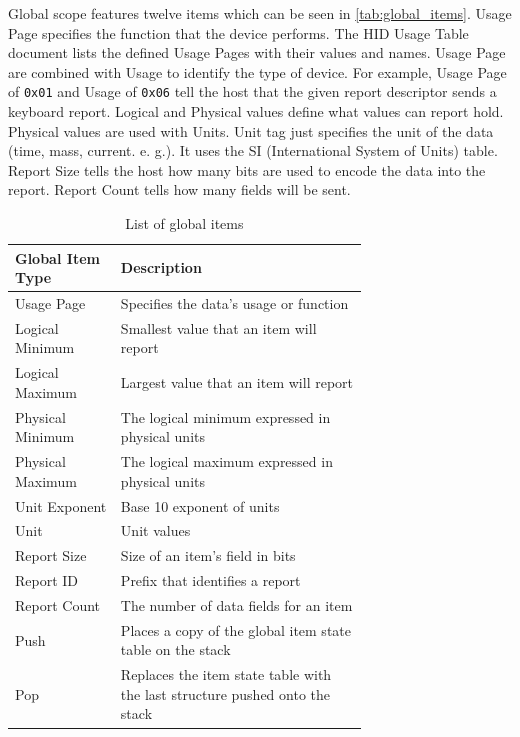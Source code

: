 Global scope features twelve items which can be seen in \autoref{tab:global_items}. Usage Page specifies the function that the device performs. The HID Usage Table document lists the defined Usage Pages with their values and names. Usage Page are combined with Usage to identify the type of device. For example, Usage Page of \verb|0x01| and Usage of \verb|0x06| tell the host that the given report descriptor sends a keyboard report. Logical and Physical values define what values can report hold. Physical values are used with Units. Unit tag just specifies the unit of the data (time, mass, current. e. g.). It uses the SI (International System of Units) table. Report Size tells the host how many bits are used to encode the data into the report. Report Count tells how many fields will be sent.

\begin{table}[ht]
    \centering
    \begin{tabular}{|l|p{0.7\linewidth}|} \hline
         \textbf{Global Item Type} & \textbf{Description} \\ \hline
         Usage Page & Specifies the data's usage or function \\ \hline
         Logical Minimum & Smallest value that an item will report \\ \hline
         Logical Maximum & Largest value that an item will report \\ \hline
         Physical Minimum & The logical minimum expressed in physical units \\ \hline
         Physical Maximum & The logical maximum expressed in physical units \\ \hline
         Unit Exponent & Base 10 exponent of units \\ \hline
         Unit & Unit values \\ \hline
         Report Size & Size of an item's field in bits \\ \hline
         Report ID & Prefix that identifies a report \\ \hline
         Report Count & The number of data fields for an item \\ \hline
         Push & Places a copy of the global item state table on the stack \\ \hline
         Pop & Replaces the item state table with the last structure pushed onto the stack \\ \hline
    \end{tabular}
    \caption{List of global items}
    \label{tab:global_items}
\end{table}

